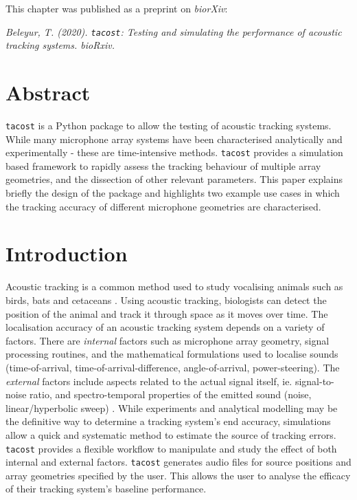 \documentclass[
]{book}
\begin{document}

This chapter was published as a preprint on \emph{biorXiv}:

\emph{Beleyur, T. (2020). \texttt{tacost}: Testing and simulating the performance of acoustic tracking systems. bioRxiv.}

\newpage

\hypertarget{tacostabstract}{%
\section*{Abstract}\label{tacostabstract}}

\texttt{tacost} is a Python package to allow the testing of acoustic tracking systems. While many microphone array systems have been characterised analytically and experimentally - these are time-intensive methods. \texttt{tacost} provides a simulation based framework to rapidly assess the tracking behaviour of multiple array geometries, and the dissection of other relevant parameters. This paper explains briefly the design of the package and highlights two example use cases in which the tracking accuracy of different microphone geometries are characterised.

\newpage

\hypertarget{introduction}{%
\section{Introduction}\label{introduction}}

Acoustic tracking is a common method used to study vocalising animals such as birds, bats and cetaceans \citep{suzuki2017harkbird, aubauer1996acoustical, mohl2000sperm, Hugel2017, Holderied20032293, rhinehart2020a, blumstein2011a}.
Using acoustic tracking, biologists can detect the position of the animal and track it through space as it moves over time. The localisation accuracy of an acoustic tracking system depends on a variety of factors. There are \emph{internal} factors such as microphone array geometry, signal processing routines, and the mathematical formulations used to localise sounds (time-of-arrival, time-of-arrival-difference, angle-of-arrival, power-steering). The \emph{external} factors include aspects related to the actual signal itself, ie. signal-to-noise ratio, and spectro-temporal properties of the emitted sound (noise, linear/hyperbolic sweep) \citep{Wahlberg1999}.
While experiments and analytical modelling may be the definitive way to determine a tracking system's end accuracy, simulations allow a quick and systematic method to estimate the source of tracking errors. \texttt{tacost} provides a flexible workflow to manipulate and study the effect of both internal and external factors. \texttt{tacost} generates audio files for source positions and array geometries specified by the user. This allows the user to analyse the efficacy of their tracking system's baseline performance.
\end{document}
